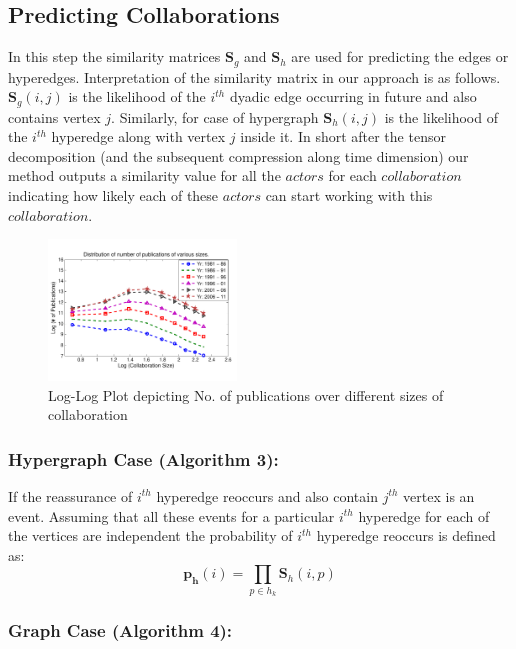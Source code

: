 \documentclass[twoside,leqno,twocolumn]{article}
\begin{document}
\subsection{Predicting Collaborations}

In this step the similarity matrices $\mathbf{S}_g$ and $\mathbf{S}_h$ are used for predicting the edges or hyperedges. Interpretation of the similarity matrix in our approach is as follows. $\mathbf{S}_g(i,j)$ is the likelihood of the $i^{th}$ dyadic edge occurring in future and also contains vertex $j$. Similarly, for case of hypergraph $\mathbf{S}_h(i,j)$ is the likelihood of the $i^{th}$ hyperedge along with vertex $j$ inside it. In short after the tensor decomposition (and the subsequent compression along time dimension) our method outputs a similarity value for all the $actors$ for each $collaboration$ indicating how likely each of these $actors$ can start working with this $collaboration$.

\begin{figure}[h!]
\centering
\includegraphics[width=50mm]{distribution.pdf}
\caption{Log-Log Plot depicting No. of publications over different sizes of collaboration}
\label{fig:distribution}
\vspace{-1.7em}
\end{figure}

\subsubsection{Hypergraph Case (Algorithm 3):}

If the reassurance of $i^{th}$ hyperedge reoccurs and also contain $j^{th}$ vertex is an event. Assuming that all these events for a particular $i^{th}$ hyperedge for each of the vertices are independent the probability of $i^{th}$ hyperedge reoccurs is defined as: \begin{equation} \mathbf{p_h}(i)=\prod \limits_{p \in h_k} \mathbf{S}_h (i,p) \end{equation} 

\subsubsection{Graph Case (Algorithm 4):}
\end{document}
